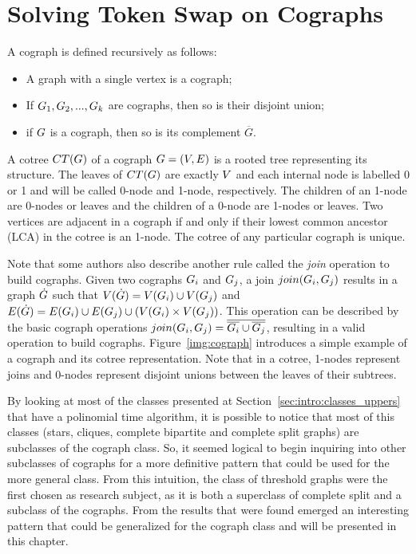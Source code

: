 \documentclass[msc]{ppgccufmg}    %
\begin{document}
\chapter{Solving Token Swap on Cographs}
\label{chp:cographs}

A cograph is defined recursively as follows:

\begin{itemize}
    \item A graph with a single vertex is a cograph;
    \item If $G_{1}, G_{2}, ... ,G_{k}$ are cographs, then 
    so is their disjoint union;
    \item if $G$ is a cograph, then so is its complement $\overline{G}$.
\end{itemize}

A cotree $CT(G)$ of a cograph $G = (V,E)$ is a rooted 
tree representing its structure. 
The leaves of $CT(G)$ are exactly $V$ and each internal 
node is labelled 0 or 1 and will be called 0-node and 1-node, respectively.
The children of an 1-node are 0-nodes or leaves and the children of a 0-node 
are 1-nodes or leaves. 
Two vertices are adjacent in a cograph if and only if their lowest common 
ancestor (LCA) in the cotree is an 1-node.
The cotree of any particular cograph is unique.

Note that some authors also describe another rule called the \textit{join} 
operation to build cographs.
Given two cographs $G_{i}$ and $G_{j}$, a join $join(G_{i},
G_{j})$ results in a graph $\dot{G}$ such that $V(\dot{G}) = V(G_{i}) \cup V(G_{j})$ and 
$E(\dot{G}) = E(G_{i}) \cup E(G_{j})
\cup ( V(G_{i}) \times V(G_{j}) )$.
This operation can be described by the basic cograph operations $join(G_{i},
G_{j}) = \overline{\overline{G_{i}} \cup \overline{G_{j}}}$, resulting 
in a valid operation to build cographs.
Figure~\ref{img:cograph} introduces a simple example of a cograph and its cotree
representation.
Note that in a cotree, 1-nodes represent joins and 0-nodes represent disjoint 
unions between the leaves of their subtrees.

By looking at most of the classes presented at Section~\ref{sec:intro:classes_uppers} 
that have a polinomial time algorithm, it is possible to notice that most of this classes 
(stars, cliques, complete bipartite and complete split graphs) are subclasses 
of the cograph class.
So, it seemed logical to begin inquiring into other subclasses of cographs for a more
definitive pattern that could be used for the more general class.
From this intuition, the class of threshold graphs were the first chosen as research
subject, as it is both a superclass of complete split and a subclass of the cographs.
From the results that were found emerged an interesting pattern that could be generalized
for the cograph class and will be presented in this chapter.
\end{document}
